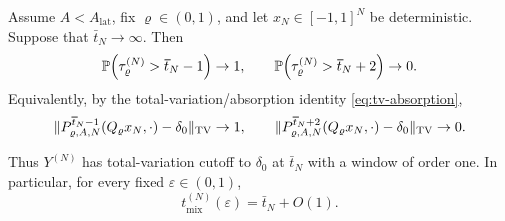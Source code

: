 \documentclass[11pt,reqno,a4paper]{article}
\newcommand{\Pp}{\P}
\newcommand{\TV}{\mathrm{TV}}
\begin{document}
\begin{theorem}
\label{thm:subcritical-dimension-cutoff}
  Assume $A<A_{\mathrm{lat}}$, fix $\varrho\in(0,1)$, and let
  $x_N\in[-1,1]^N$ be deterministic. Suppose that $\bar t_N\to\infty$.
  Then
  \begin{equation}\label{eq:subcritical-dimension-cutoff}
    \Pp\left(
      \tau_{\varrho}^{(N)}
      >
      \bar t_N-1
    \right)
    \to1,
    \qquad
    \Pp\left(
      \tau_{\varrho}^{(N)}
      >
      \bar t_N+2
    \right)
    \to0.
  \end{equation}
  Equivalently, by the total-variation/absorption identity
  \cref{eq:tv-absorption},
  \begin{equation}\label{eq:subcritical-dimension-tv-cutoff}
    \norm{
      P_{\varrho,A,N}^{\bar t_N-1}
      (Q_\varrho x_N,\cdot)-\delta_0
    }_{\TV}
    \to1,
    \qquad
    \norm{
      P_{\varrho,A,N}^{\bar t_N+2}
      (Q_\varrho x_N,\cdot)-\delta_0
    }_{\TV}
    \to0 .
  \end{equation}
\end{theorem}

Thus $Y^{(N)}$ has total-variation cutoff to $\delta_0$ at $\bar t_N$ with
a window of order one. In particular, for every fixed $\varepsilon\in(0,1)$,
\begin{equation*}
  t_{\mathrm{mix}}^{(N)}(\varepsilon)
  =
  \bar t_N+O(1).
\end{equation*}
\end{document}
